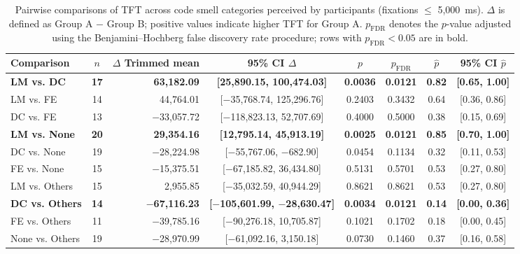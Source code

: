 \begin{table}[!tp]
    \centering
    \footnotesize
    \caption{Pairwise comparisons of TFT across code smell categories perceived by participants (fixations $\leq$ 5,000~ms).
    $\Delta$ is defined as Group A $-$ Group B; positive values indicate higher TFT for Group A.
    $p_{\mathrm{FDR}}$ denotes the $p$-value adjusted using the Benjamini--Hochberg false discovery rate procedure; rows with $p_{\mathrm{FDR}} < 0.05$ are in bold.}
    \label{tab:perceived_smell_types_tft}
    \setlength{\tabcolsep}{4pt}
    \renewcommand{\arraystretch}{1.2}
    \begin{tabular}{l c r c c c c c}
        \toprule
        \textbf{Comparison} & \textbf{$n$} & \textbf{$\Delta$ Trimmed mean} & \textbf{95\% CI $\Delta$} &
        \textbf{$p$} & \textbf{$p_{\mathrm{FDR}}$} & \textbf{$\hat{p}$} & \textbf{95\% CI $\hat{p}$} \\
        \midrule
        \textbf{LM vs. DC} & \textbf{17} & \textbf{63,182.09} & \textbf{[25,890.15, 100,474.03]} & \textbf{0.0036} & \textbf{0.0121} & \textbf{0.82} & \textbf{[0.65, 1.00]} \\
        LM vs. FE & 14 & 44,764.01 & [$-$35,768.74, 125,296.76] & 0.2403 & 0.3432 & 0.64 & [0.36, 0.86] \\
        DC vs. FE & 13 & $-$33,057.72 & [$-$118,823.13, 52,707.69] & 0.4000 & 0.5000 & 0.38 & [0.15, 0.69] \\
        \textbf{LM vs. None} & \textbf{20} & \textbf{29,354.16} & \textbf{[12,795.14, 45,913.19]} & \textbf{0.0025} & \textbf{0.0121} & \textbf{0.85} & \textbf{[0.70, 1.00]} \\
        DC vs. None & 19 & $-$28,224.98 & [$-$55,767.06, $-$682.90] & 0.0454 & 0.1134 & 0.32 & [0.11, 0.53] \\
        FE vs. None & 15 & $-$15,375.51 & [$-$67,185.82, 36,434.80] & 0.5131 & 0.5701 & 0.53 & [0.27, 0.80] \\
        LM vs. Others & 15 & 2,955.85 & [$-$35,032.59, 40,944.29] & 0.8621 & 0.8621 & 0.53 & [0.27, 0.80] \\
        \textbf{DC vs. Others} & \textbf{14} & \textbf{$-$67,116.23} & \textbf{[$-$105,601.99, $-$28,630.47]} & \textbf{0.0034} & \textbf{0.0121} & \textbf{0.14} & \textbf{[0.00, 0.36]} \\
        FE vs. Others & 11 & $-$39,785.16 & [$-$90,276.18, 10,705.87] & 0.1021 & 0.1702 & 0.18 & [0.00, 0.45] \\
        None vs. Others & 19 & $-$28,970.99 & [$-$61,092.16, 3,150.18] & 0.0730 & 0.1460 & 0.37 & [0.16, 0.58] \\
        \bottomrule
    \end{tabular}
\end{table}
